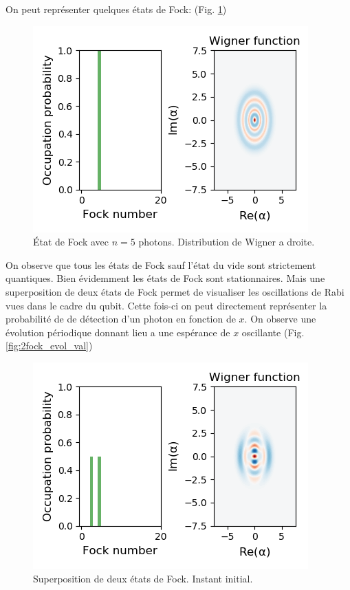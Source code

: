 \documentclass[11pt,a4paper]{article}
\newcommand{\q}{q\hspace{-0.5ex}u}
\begin{document}
	On peut représenter quelques états de Fock: (Fig. \ref{fig:fock})
	\begin{figure}
		\centering
		\includegraphics[width=0.7\linewidth]{Fock}
		\caption{État de Fock avec $n=5$ photons. Distribution de Wigner a droite.}
		\label{fig:fock}
	\end{figure}
	
	
	On observe que tous les états de Fock sauf l'état du vide sont strictement quantiques.
	Bien évidemment les états de Fock sont stationnaires. Mais une superposition de deux états de Fock permet de visualiser les oscillations de Rabi vues dans le cadre du \q bit. Cette fois-ci on peut directement représenter la probabilité de de détection d'un photon en fonction de $x$. On observe une évolution périodique donnant lieu a une espérance de $x$ oscillante (Fig. \ref{fig:2fock_evol_val})
	
	\begin{figure}
		\centering
		\includegraphics[width=0.7\linewidth]{2Fock}
		\caption{Superposition de deux états de Fock. Instant initial.}
		\label{fig:2fock}
	\end{figure}
\end{document}
